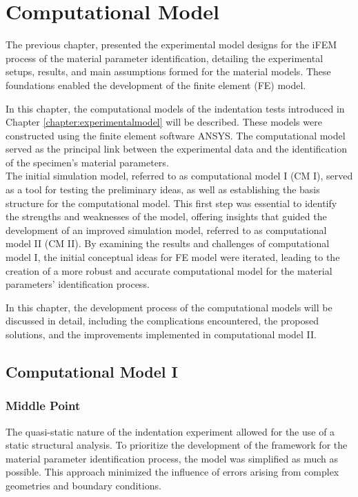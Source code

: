 
\chapter{Computational Model} %
\label{chapter:computationalmodel} %

The previous chapter, presented the experimental model designs for the iFEM process of the material 
parameter identification, detailing the experimental setups, results, and main assumptions 
formed for the material models. These foundations enabled the development of the finite element (FE) model.

In this chapter, the computational models of the indentation tests introduced in Chapter \ref{chapter:experimentalmodel} 
will be described. These models were constructed using the finite element software ANSYS. 
The computational model served as the principal link between the experimental data and the identification of the 
specimen's material parameters.\\  

The initial simulation model, referred to as computational model I (CM I), served as a tool 
for testing the preliminary ideas, as well as establishing the basis structure for 
the computational model. This first step was essential to identify the strengths and 
weaknesses of the model, offering insights that guided the development of an 
improved simulation model, referred to as computational model II (CM II). By examining the 
results and challenges of computational model I, the initial conceptual ideas for FE model 
were iterated, leading to the creation of a more robust and accurate computational model
for the material parameters' identification process.

In this chapter, the development process of the computational models will be discussed in detail, 
including the complications encountered, the proposed solutions, 
and the improvements implemented in computational model II.

\section{Computational Model I}
\label{section:cpI}
\subsection{Middle Point}
\label{subsection:mpcpI}
The quasi-static nature of the indentation experiment allowed for the use of a static 
structural analysis. To prioritize the development of the framework for the material 
parameter identification process, the model was simplified as much as possible.
This approach minimized the influence of errors arising from complex geometries and boundary conditions.

